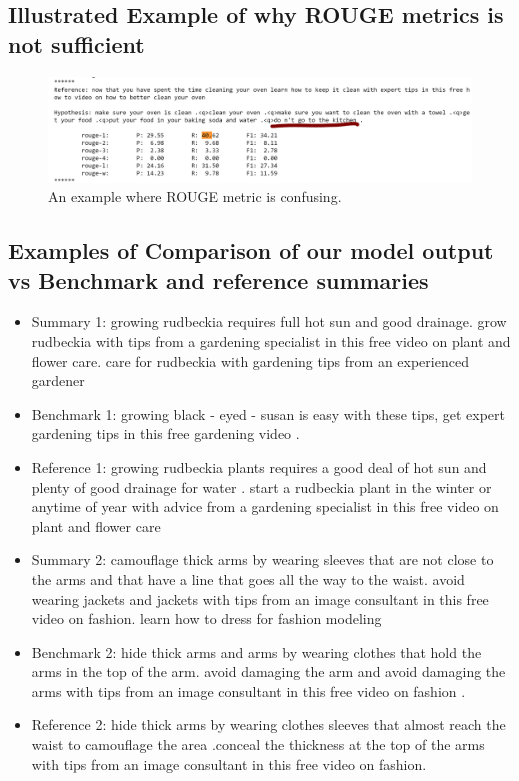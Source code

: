 \documentclass{article}
\begin{document}
\subsection{Illustrated Example of why ROUGE metrics is not sufficient}

\begin{figure}[H]
  \includegraphics[width=\linewidth]{pic1.png}
  \caption{An example where ROUGE metric is confusing.}
  \label{fig:funnysummary}
\end{figure}

\subsection{Examples of Comparison of our model output vs Benchmark and reference summaries}
\begin{itemize}

\item Summary 1: growing rudbeckia requires full hot sun and good drainage. grow rudbeckia with tips from a gardening specialist in this free video on plant and flower care. care for rudbeckia with gardening tips from an experienced gardener
\item Benchmark 1: growing black - eyed - susan is easy with these tips, get expert gardening tips in this free gardening video .
\item Reference 1: growing rudbeckia plants requires a good deal of hot sun and plenty of good drainage for water . start a rudbeckia plant in the winter or anytime of year with advice from a gardening specialist in this free video on plant and flower care 
 
\item Summary 2: camouflage thick arms by wearing sleeves that are not close to the arms and that have a line that goes all the way to the waist. avoid wearing jackets and jackets with tips from an image consultant in this free video on fashion. learn how to dress for fashion modeling
\item Benchmark 2: hide thick arms and arms by wearing clothes that hold the arms in the top of the arm. avoid damaging the arm and avoid damaging the arms with tips from an image consultant in this free video on fashion .
\item Reference 2: hide thick arms by wearing clothes sleeves that almost reach the waist to camouflage the area .conceal the thickness at the top of the arms with tips from an image consultant in this free video on fashion.

\end{itemize}
\end{document}
